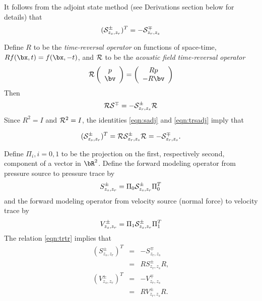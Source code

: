 It follows from the adjoint state method (see Derivations section
below for details) that
\begin{equation}
  \label{eqn:sadj1}
  ({\cal S}^{\pm}_{z_s, z_r})^T = -{\cal S}^{\mp}_{z_r,z_s}
\end{equation}

Define $R$ to be the {\em time-reversal operator} on functions of
space-time, $Rf(\bx,t) = f(\bx,-t)$, and ${\cal R}$ to be the {\em
  acoustic field time-reversal operator}
\begin{equation}
  \label{eqn:trdef}
  {\cal R} \left(
    \begin{array}{c}
      p\\
      \bv
    \end{array}
  \right) =
  \left(
    \begin{array}{c}
      Rp\\
      -R\bv
    \end{array}
  \right)
\end{equation}
Then 
\begin{equation}
  \label{eqn:trsadj}
  {\cal R}{\cal S}^{\mp} = -{\cal S}^{\pm}_{z_r,z_s}{\cal R}
\end{equation}
Since $R^2 = I$ and ${\cal R}^2 = I$, the identities \ref{eqn:sadj} and \ref{eqn:trsadj} imply that

\begin{equation} 
  \label{eqn:trtr}
 ({\cal S}^{\pm}_{z_s,z_r})^T = {\cal R}{\cal S}_{z_r,z_s}^{\pm}{\cal R}=
 -{\cal S}^{\mp}_{z_r,z_s}.
\end{equation}

Define $\Pi_i, i=0,1$ to be the projection on the first,
respectively second, component of a vector in $\bR^2$. Define the
forward modeling operator from pressure source to pressure trace by
\begin{equation}
  \label{eqn:sdef}
  S^{\pm}_{z_s,z_r} = \Pi_0 {\cal S}^{\pm}_{z_s,z_r} \Pi_0^T 
\end{equation}
and the forward modeling operator from velocity source (normal force)
to velocity trace by 
\begin{equation}
  \label{eqn:vdef}
  V^{\pm}_{z_s,z_r} = \Pi_1 {\cal S}^{\pm}_{z_s,z_r} \Pi_1^T 
\end{equation}
The relation \ref{eqn:trtr} implies that
\begin{eqnarray}
  (S^{\pm}_{z_s,z_r})^T &=& -S^{\mp}_{z_r,z_s} \nonumber\\
                        &=& R S^{\pm}_{z_r,z_s}R, \nonumber\\
    (V^{\pm}_{z_s,z_r})^T &=& -V^{\mp}_{z_r,z_s} \nonumber\\
                        &=& R V^{\pm}_{z_r,z_s}R.
                            \label{eqn:trtrcomp}
\end{eqnarray}
  

